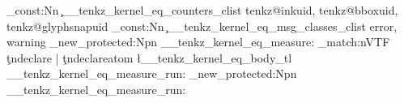 \clist_const:Nn \c__tenkz_kernel_eq_counters_clist
  { tenkz@inkuid, tenkz@bboxuid, tenkz@glyphsnapuid }
\clist_const:Nn \c__tenkz_kernel_eq_msg_classes_clist
  { error, warning }
\cs_new_protected:Npn \__tenkz_kernel_eq_measure:
  {
    \regex_match:nVTF { \c{tndeclare} | \c{tndeclareatom} }
      \l__tenkz_kernel_eq_body_tl
      { }
      { \__tenkz_kernel_eq_measure_run: }
  }
\cs_new_protected:Npn \__tenkz_kernel_eq_measure_run:
